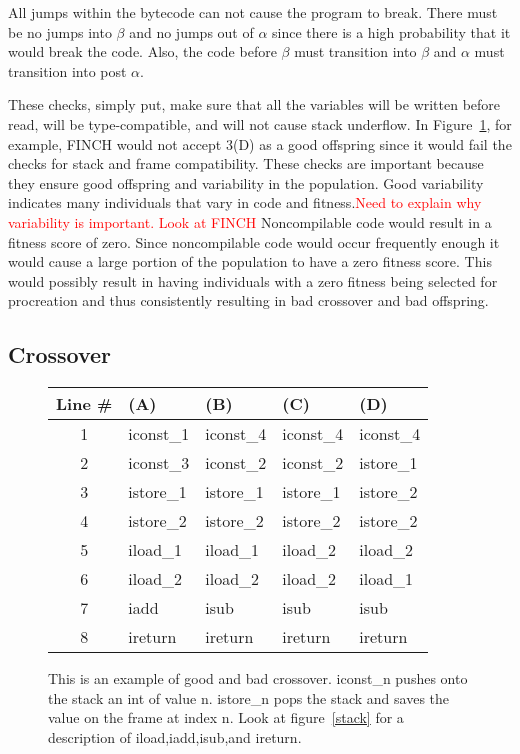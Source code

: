 \documentclass{sig-alternate}
\newcommand{\mycomment}[1]{\textcolor{red}{#1}}
\begin{document}
All jumps within the bytecode can not cause the program to break. There must be no jumps into $\beta$ and no jumps out of $\alpha$ since there is a high probability that it would break the code. Also, the code before $\beta$ must transition into $\beta$ and $\alpha$ must transition into post $\alpha$.\par


These checks, simply put, make sure that all the variables will be written before read, will be type-compatible, and will not cause stack underflow\cite{FINCH2:2009}. In Figure~\ref{crossover}, for example, FINCH would not accept 3(D) as a good offspring since it would fail the checks for stack and frame compatibility.
These checks are important because they ensure good offspring and variability in the population. Good variability indicates many individuals that vary in code and fitness.\mycomment{Need to explain why variability is important. Look at FINCH} Noncompilable code would result in a fitness score of zero. Since noncompilable code would occur frequently enough it would cause a large portion of the population to have a zero fitness score. This would possibly result in having individuals with a zero fitness being selected for procreation and thus consistently resulting in bad crossover and bad offspring.



\subsection{Crossover}

\begin{figure}
\begin{tabular}{|c|l|l|l|l|}

\hline
Line \#&(A)&(B)&(C)&(D)\\  \hline
1&iconst\_1&iconst\_4&iconst\_4&iconst\_4\\
2&iconst\_3&iconst\_2&iconst\_2&istore\_1\\
3&istore\_1&istore\_1&istore\_1&istore\_2\\
4&istore\_2&istore\_2&istore\_2&istore\_2\\
5&iload\_1&iload\_1&iload\_2&iload\_2\\
6&iload\_2&iload\_2&iload\_2&iload\_1\\
7&iadd&isub&isub&isub\\
8&ireturn&ireturn&ireturn&ireturn\\
\hline
\end{tabular}
\caption{This is an example of good and bad crossover. iconst\_n pushes onto the stack an int of value n. istore\_n pops the stack and saves the value on the frame at index n. Look at figure~\ref{stack} for a description of iload,iadd,isub,and ireturn.}
\label{crossover}
  
\end{figure}
\end{document}
